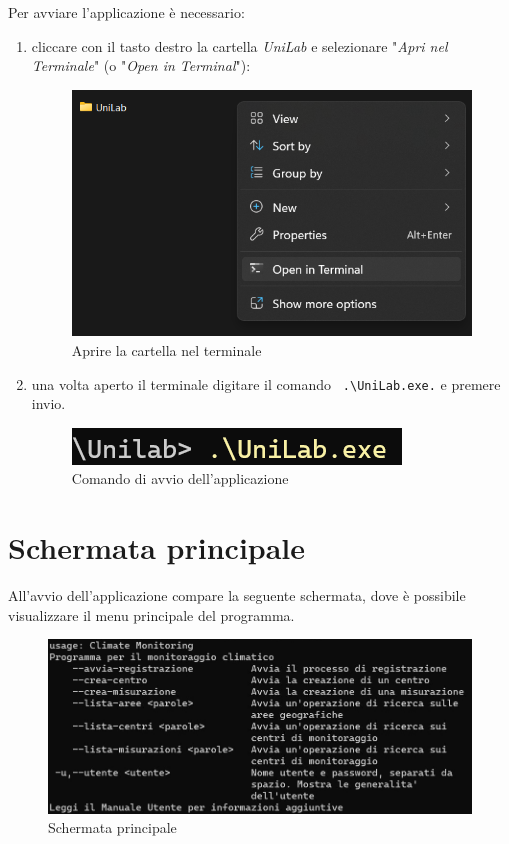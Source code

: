 \documentclass[12pt]{scrreprt}
\begin{document}
	Per avviare l'applicazione \`e necessario:
	\begin{enumerate}
		\item cliccare con il tasto destro la cartella \textsl{UniLab} e selezionare "\textsl{Apri nel Terminale}" (o "\textsl{Open in Terminal}"):
		\begin{figure}[H]
			\centering
			\includegraphics[width=0.7\linewidth]{Screen/aprinelterminale}
			\caption{Aprire la cartella nel terminale}
			\label{fig:aprinelterminale}
		\end{figure}
		\item una volta aperto il terminale digitare il comando
		\verb! .\UniLab.exe.! e premere invio.
		\begin{figure}[H]
			\centering
			\includegraphics[width=0.25\linewidth]{Screen/avviocom}
			\caption{Comando di avvio dell'applicazione}
			\label{fig:avviocom}
		\end{figure}
	\end{enumerate}
	
	\section{Schermata principale}

	
	All'avvio dell'applicazione compare la seguente schermata, dove \`e possibile visualizzare il menu principale del programma.
	\begin{figure}[H]
		\centering
		\includegraphics[width=0.9\linewidth]{Screen/schermataprincipale}
		\caption{Schermata principale}
		\label{fig:schermataprincipale}
	\end{figure}	
		
\end{document}
